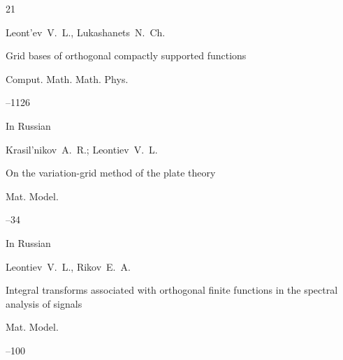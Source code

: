 \begin{thebibliography}{21}




\by Leont'ev~V.~L., Lukashanets~N.~Ch.

\paper Grid bases of orthogonal compactly supported functions



\jour Comput. Math. Math. Phys.




--1126






\lang In Russian

\by Krasil'nikov~A.~R.; Leontiev~V.~L.

\paper On the variation-grid method of the plate theory

\jour Mat. Model. 




--34






\lang In Russian

\by Leontiev~V.~L., Rikov~E.~A.

\paper Integral transforms associated with orthogonal finite functions in the spectral analysis of signals

\jour Mat. Model. 




--100










\end{thebibliography}
